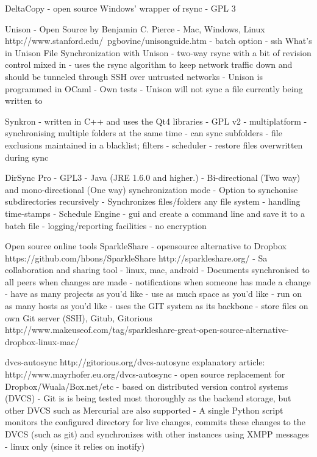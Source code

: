 			DeltaCopy
				- open source Windows' wrapper of rsync		
				- GPL 3
				
			Unison
				- Open Source by Benjamin C. Pierce 
				- Mac, Windows, Linux
				http://www.stanford.edu/~pgbovine/unisonguide.htm
					- batch option
					- ssh
				What's in Unison
				File Synchronization with Unison
					- two-way rsync with a bit of revision control mixed in
					- uses the rsync algorithm to keep network traffic down and should be tunneled through SSH over untrusted networks
					- Unison is programmed in OCaml
				- Own tests
					- Unison will not sync a file currently being written to
					
			Synkron
				- written in C++ and uses the Qt4 libraries
				- GPL v2
				- multiplatform 
				- synchronising multiple folders at the same time
				- can sync subfolders
				- file exclusions maintained in a blacklist; filters
				- scheduler
				- restore files overwritten during sync
				
			DirSync Pro 
				- GPL3
				- Java (JRE 1.6.0 and higher.)
				- Bi-directional (Two way) and mono-directional (One way) synchronization mode
				- Option to synchonise subdirectories recursively
				- Synchronizes files/folders any file system
				- handling time-stamps
				- Schedule Engine
				- gui and create a command line and save it to a batch file
				- logging/reporting facilities
				- no encryption
				
		Open source online tools
			SparkleShare 
				- opensource alternative to Dropbox
				https://github.com/hbons/SparkleShare
				http://sparkleshare.org/
					- Sa collaboration and sharing tool 
					- linux, mac, android
					- Documents synchronised to all peers when changes are made
					- notifications when someone has made a change
					- have as many projects as you'd like
					- use as much space as you'd like
					- run on as many hosts as you'd like
					- uses the GIT system as its backbone
					- store files on own Git server (SSH), Gitub, Gitorious
				http://www.makeuseof.com/tag/sparkleshare-great-open-source-alternative-dropbox-linux-mac/
				
			dvcs-autosync
				http://gitorious.org/dvcs-autosync
				explanatory article: http://www.mayrhofer.eu.org/dvcs-autosync
					- open source replacement for Dropbox/Wuala/Box.net/etc
					- based on distributed version control systems (DVCS)
					- Git is is being tested most thoroughly as the backend storage, but other DVCS such as Mercurial are also supported
					- A single Python script monitors the configured directory for live changes, commits these changes to the DVCS (such as git) and synchronizes with other instances using XMPP messages
					- linux only (since it relies on inotify)
					
